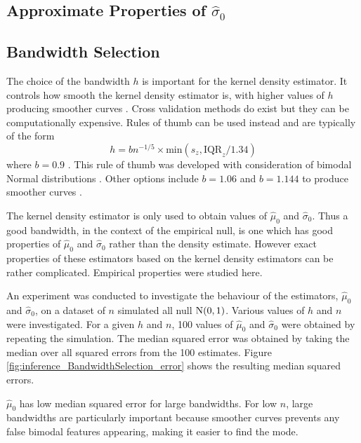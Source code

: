 \subsection{Approximate Properties of $\widehat{\sigma}_0$}

\subsection{Bandwidth Selection}

The choice of the bandwidth $h$ is important for the kernel density estimator. It controls how smooth the kernel density estimator is, with higher values of $h$ producing smoother curves \citep{friedman2001elements}. Cross validation methods do exist \citep{bowman1984alternative, sheather2004density} but they can be computationally expensive. Rules of thumb \citep{silverman1986density, sheather2004density} can be used instead and are typically of the form
\begin{equation}
  h = bn^{-1/5}\times\text{min}\left(s_z,\text{IQR}_z/1.34\right)
\end{equation}
where $b=0.9$ \citep{silverman1986density}. This rule of thumb was developed with consideration of bimodal Normal distributions \citep{silverman1986density}. Other options include $b=1.06$ and $b=1.144$ to produce smoother curves \citep{silverman1986density, sheather2004density}.

The kernel density estimator is only used to obtain values of $\widehat{\mu}_0$ and $\widehat{\sigma}_0$. Thus a good bandwidth, in the context of the empirical null, is one which has good properties of $\widehat{\mu}_0$ and $\widehat{\sigma}_0$ rather than the density estimate. However exact properties of these estimators based on the kernel density estimators can be rather complicated. Empirical properties were studied here.

An experiment was conducted to investigate the behaviour of the estimators, $\widehat{\mu}_0$ and $\widehat{\sigma}_0$, on a dataset of $n$ simulated all null $\operatorname{N}(0,1)$. Various values of $h$ and $n$ were investigated. For a given $h$ and $n$, 100 values of $\widehat{\mu}_0$ and $\widehat{\sigma}_0$ were obtained by repeating the simulation. The median squared error was obtained by taking the median over all squared errors from the 100 estimates. Figure \ref{fig:inference_BandwidthSelection_error} shows the resulting median squared errors.

$\widehat{\mu}_0$ has low median squared error for large bandwidths. For low $n$, large bandwidths are particularly important because smoother curves prevents any false bimodal features appearing, making it easier to find the mode.

